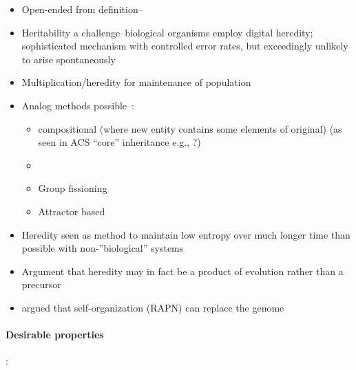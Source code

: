 \begin{itemize}
	\item
	Open-ended from \autocite{MaynardSmith1999} definition--
	\item
	Heritability a challenge--biological organisms employ digital
	heredity; sophisticated mechanism with controlled error rates, but
	exceedingly unlikely to arise spontaneously
	\item
	Multiplication/heredity for maintenance of population
	\item
	Analog methods possible--\eg:
	
	\begin{itemize}
		\item
		compositional (where new entity contains some elements of original)
		(as seen in ACS ``core'' inheritance e.g., \autocite{Vasas2015, Watson2012}?)
		\item
		\item
		Group fissioning \autocite{Watson2015}
		\item
		Attractor based \autocite{Szathmary2000}
	\end{itemize}
	\item
	Heredity seen as method to maintain low entropy over much longer time
	than possible with non-''biological'' systems \autocite{Adami2015}
	\item
	Argument that heredity may in fact be a product of evolution rather than a precursor \autocite{Bourrat2015}
	\item
	\autocite{Kauffman:1993kk} argued that self-organization (RAPN) can replace the genome
\end{itemize}

\paragraph{Desirable properties}\label{desirable-properties}

\autocite{Suzuki2003}:

